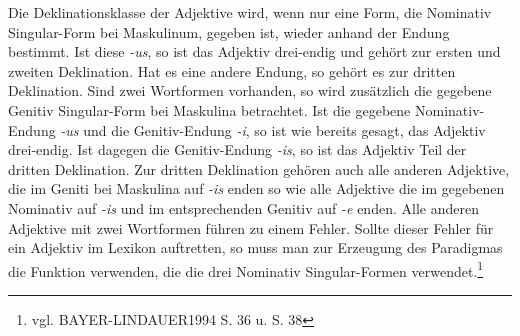 \documentclass[12pt,abstract=on,titlepage,bibliography=totoc,ngerman,listof=totoc]{scrreprt}
\begin{document}
Die Deklinationsklasse der Adjektive wird, wenn nur eine Form, die Nominativ Singular-Form bei Maskulinum, gegeben ist, wieder anhand der Endung bestimmt. Ist diese \textit{-us}, so ist das Adjektiv drei-endig und gehört zur ersten und zweiten Deklination. Hat es eine andere Endung, so gehört es zur dritten Deklination. Sind zwei Wortformen vorhanden, so wird zusätzlich die gegebene Genitiv Singular-Form bei Maskulina betrachtet. Ist die gegebene Nominativ-Endung \textit{-us} und die Genitiv-Endung \textit{-i}, so ist wie bereits gesagt, das Adjektiv drei-endig. Ist dagegen die Genitiv-Endung \textit{-is}, so ist das Adjektiv Teil der dritten Deklination. Zur dritten Deklination gehören auch alle anderen Adjektive, die im Geniti bei Maskulina auf \textit{-is} enden so wie alle Adjektive die im gegebenen Nominativ auf \textit{-is} und im entsprechenden Genitiv auf \textit{-e} enden. Alle anderen Adjektive mit zwei Wortformen führen zu einem Fehler. Sollte dieser Fehler für ein Adjektiv im Lexikon auftretten, so muss man zur Erzeugung des Paradigmas die Funktion verwenden, die die drei Nominativ Singular-Formen verwendet.\footnote{vgl. BAYER-LINDAUER1994 S. 36 u. S. 38} \par
\end{document}
